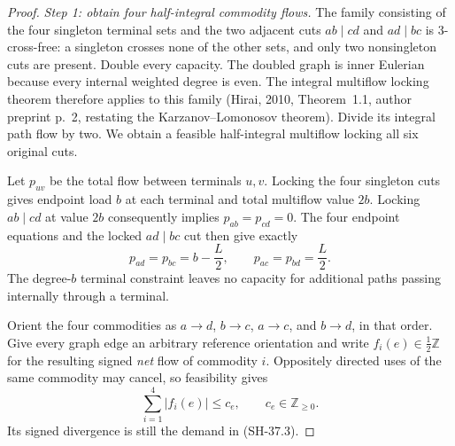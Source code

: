 \begin{proof}
\emph{Step 1: obtain four half-integral commodity flows.}
The family consisting of the four singleton terminal sets
and the two adjacent cuts $ab\mid cd$ and $ad\mid bc$ is
$3$-cross-free: a singleton crosses none of the other sets,
and only two nonsingleton cuts are present.  Double every
capacity.  The doubled graph is inner Eulerian because
every internal weighted degree is even.  The integral
multiflow locking theorem therefore applies to this family
(Hirai, 2010, Theorem~1.1, author preprint p.~2, restating
the Karzanov--Lomonosov theorem).  Divide its integral path
flow by two.  We obtain a feasible half-integral multiflow
locking all six original cuts.

Let $p_{uv}$ be the total flow between terminals $u,v$.
Locking the four singleton cuts gives endpoint load $b$
at each terminal and total multiflow value $2b$.
Locking $ab\mid cd$ at value $2b$ consequently implies
$p_{ab}=p_{cd}=0$.  The four endpoint equations and the
locked $ad\mid bc$ cut then give exactly
\[
 p_{ad}=p_{bc}=b-\frac L2,\qquad
 p_{ac}=p_{bd}=\frac L2.                              \tag{SH-37.3}
\]
The degree-$b$ terminal constraint leaves no capacity for
additional paths passing internally through a terminal.

Orient the four commodities as $a\to d$, $b\to c$,
$a\to c$, and $b\to d$, in that order.  Give every graph
edge an arbitrary reference orientation and write
$f_i(e)\in\tfrac12\mathbb Z$ for the resulting signed
\emph{net} flow of commodity $i$.  Oppositely directed
uses of the same commodity may cancel, so feasibility gives
\[
 \sum_{i=1}^4|f_i(e)|\le c_e,\qquad c_e\in\mathbb Z_{\ge0}.
                                                        \tag{SH-37.4}
\]
Its signed divergence is still the demand in (SH-37.3).


\end{proof}
